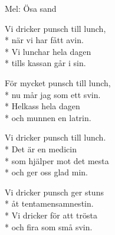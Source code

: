 \begin{SongText}[Studiemedelsrundo]
    \begin{SongInfo}
        Mel: Ösa sand
    \end{SongInfo}
    \begin{SongVerse}
        Vi dricker punsch till lunch,\\*%
        när vi har fått avin.\\*%
        Vi lunchar hela dagen\\*%
        tills kassan går i sin.
    \end{SongVerse}
    \begin{SongVerse}
        För mycket punsch till lunch,\\*%
        nu mår jag som ett svin.\\*%
        Helkass hela dagen\\*%
        och munnen en latrin.
    \end{SongVerse}
    \begin{SongVerse}
        Vi dricker punsch till lunch.\\*%
        Det är en medicin\\*%
        som hjälper mot det mesta\\*%
        och ger oss glad min.
    \end{SongVerse}
    \begin{SongVerse}
        Vi dricker punsch ger stuns\\*%
        åt tentamensamnestin.\\*%
        Vi dricker för att trösta\\*%
        och fira som små svin.
    \end{SongVerse}
\end{SongText}